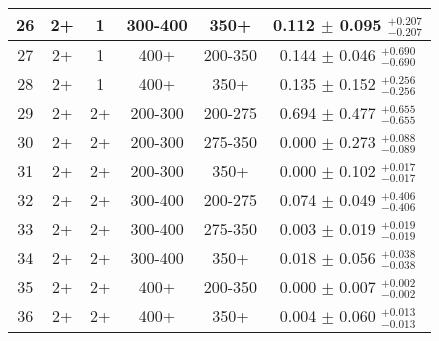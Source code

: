 \begin{table}[htbp]
\begin{centering}
\begin{lrbox}{\closureBox}
\begin{tabular}{|c|c|c|c|c||c|}
 \hline
             26 &              2+ &               1 &         300-400 &            350+ & 0.112 $\pm$ 0.095 $^{+0.207}_{-0.207}$  \\
 \hline
             27 &              2+ &               1 &            400+ &         200-350 & 0.144 $\pm$ 0.046 $^{+0.690}_{-0.690}$  \\
 \hline
             28 &              2+ &               1 &            400+ &            350+ & 0.135 $\pm$ 0.152 $^{+0.256}_{-0.256}$  \\
 \hline
             29 &              2+ &              2+ &         200-300 &         200-275 & 0.694 $\pm$ 0.477 $^{+0.655}_{-0.655}$  \\
 \hline
             30 &              2+ &              2+ &         200-300 &         275-350 & 0.000 $\pm$ 0.273 $^{+0.088}_{-0.089}$  \\
 \hline
             31 &              2+ &              2+ &         200-300 &            350+ & 0.000 $\pm$ 0.102 $^{+0.017}_{-0.017}$  \\
 \hline
             32 &              2+ &              2+ &         300-400 &         200-275 & 0.074 $\pm$ 0.049 $^{+0.406}_{-0.406}$  \\
 \hline
             33 &              2+ &              2+ &         300-400 &         275-350 & 0.003 $\pm$ 0.019 $^{+0.019}_{-0.019}$  \\
 \hline
             34 &              2+ &              2+ &         300-400 &            350+ & 0.018 $\pm$ 0.056 $^{+0.038}_{-0.038}$  \\
 \hline
             35 &              2+ &              2+ &            400+ &         200-350 & 0.000 $\pm$ 0.007 $^{+0.002}_{-0.002}$  \\
 \hline
             36 &              2+ &              2+ &            400+ &            350+ & 0.004 $\pm$ 0.060 $^{+0.013}_{-0.013}$  \\
 \hline
\end{tabular}
\end{lrbox}
\scalebox{0.80}{\usebox{\closureBox}}
\par\end{centering}
\end{table}


